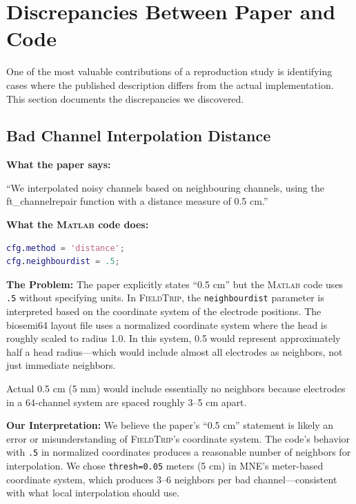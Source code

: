 \documentclass[11pt,a4paper]{article}
\newcommand{\matlab}{\textsc{Matlab}}
\newcommand{\fieldtrip}{\textsc{FieldTrip}}
\begin{document}

\section{Discrepancies Between Paper and Code}
\label{sec:discrepancies}

One of the most valuable contributions of a reproduction study is identifying cases where the published description differs from the actual implementation. This section documents the discrepancies we discovered.

\subsection{Bad Channel Interpolation Distance}
\label{subsec:interpolation}

\textbf{What the paper says:}
\begin{paperquote}
``We interpolated noisy channels based on neighbouring channels, using the ft\_channelrepair function with a distance measure of 0.5 cm.''
\end{paperquote}

\textbf{What the \matlab{} code does:}
\begin{lstlisting}[style=matlabstyle,language=Matlab]
cfg.method = 'distance';
cfg.neighbourdist = .5;
\end{lstlisting}

\textbf{The Problem:}
The paper explicitly states ``0.5 cm'' but the \matlab{} code uses \texttt{.5} without specifying units. In \fieldtrip{}, the \texttt{neighbourdist} parameter is interpreted based on the coordinate system of the electrode positions. The biosemi64 layout file uses a normalized coordinate system where the head is roughly scaled to radius 1.0. In this system, 0.5 would represent approximately half a head radius---which would include almost all electrodes as neighbors, not just immediate neighbors.

Actual 0.5 cm (5 mm) would include essentially no neighbors because electrodes in a 64-channel system are spaced roughly 3--5 cm apart.

\textbf{Our Interpretation:}
We believe the paper's ``0.5 cm'' statement is likely an error or misunderstanding of \fieldtrip{}'s coordinate system. The code's behavior with \texttt{.5} in normalized coordinates produces a reasonable number of neighbors for interpolation. We chose \texttt{thresh=0.05} meters (5 cm) in MNE's meter-based coordinate system, which produces 3--6 neighbors per bad channel---consistent with what local interpolation should use.
\end{document}

